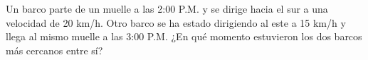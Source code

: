 \item Un barco parte de un muelle a las 2:00 P.M. y se dirige hacia el sur a una velocidad de 20 km/h. Otro barco se ha estado dirigiendo al este a 15 km/h y llega al mismo muelle a las 3:00 P.M. ¿En qué momento estuvieron los dos barcos más cercanos entre sí?
